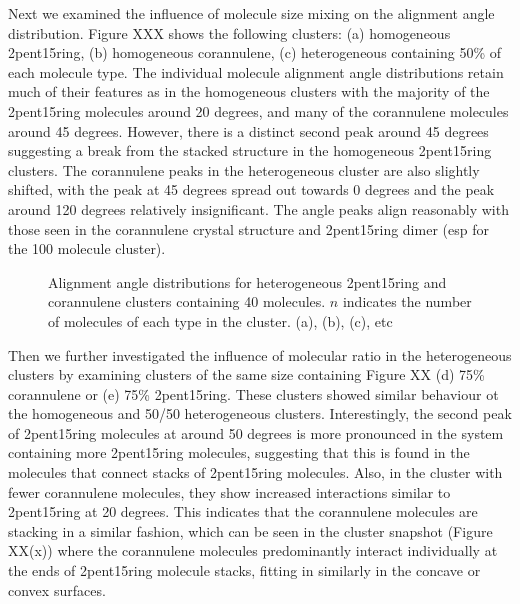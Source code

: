 Next we examined the influence of molecule size mixing on the alignment angle distribution.  Figure XXX shows the following clusters: (a) homogeneous 2pent15ring, (b) homogeneous corannulene, (c) heterogeneous containing 50\% of each molecule type. The individual molecule alignment angle distributions retain much of their features as in the homogeneous clusters with the majority of the 2pent15ring molecules around 20 degrees, and many of the corannulene molecules around 45 degrees.  However, there is a distinct second peak around 45 degrees suggesting a break from the stacked structure in the homogeneous 2pent15ring clusters.  The corannulene peaks in the heterogeneous cluster are also slightly shifted, with the peak at 45 degrees spread out towards 0 degrees and the peak around 120 degrees relatively insignificant.
The angle peaks align reasonably with those seen in the corannulene crystal structure and 2pent15ring dimer (esp for the 100 molecule cluster).
%
\begin{figure}[!tbh]
\centering
\caption{Alignment angle distributions for heterogeneous 2pent15ring and corannulene clusters containing 40 molecules. $n$ indicates the number of molecules of each type in the cluster. (a), (b), (c), etc}
\label{fig:alignmentangles_hetero}
\end{figure}
%

Then we further investigated the influence of molecular ratio in the heterogeneous clusters by examining clusters of the same size containing Figure XX (d) 75\% corannulene or (e) 75\% 2pent15ring.  These clusters showed similar behaviour ot the homogeneous and 50/50 heterogeneous clusters.  Interestingly, the second peak of 2pent15ring molecules at around 50 degrees is more pronounced in the system containing more 2pent15ring molecules, suggesting that this is found in the molecules that connect stacks of 2pent15ring molecules.  Also, in the cluster with fewer corannulene molecules, they show increased interactions similar to 2pent15ring at 20 degrees.  This indicates that the corannulene molecules are stacking in a similar fashion, which can be seen in the cluster snapshot (Figure XX(x)) where the corannulene molecules predominantly interact individually at the ends of 2pent15ring molecule stacks, fitting in similarly in the concave or convex surfaces.

